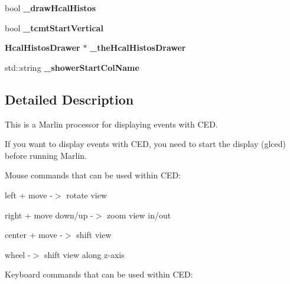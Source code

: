 \begin{DoxyCompactItemize}
\item 
bool {\bfseries \-\_\-draw\-Hcal\-Histos}\label{classCALICE_1_1EventDisplayProcessor_a6763de26bb6b411cbace86b1df1a6070}

\item 
bool {\bfseries \-\_\-tcmt\-Start\-Vertical}\label{classCALICE_1_1EventDisplayProcessor_a6c010062901aec5839d39d9b54e1719e}

\item 
{\bf Hcal\-Histos\-Drawer} $\ast$ {\bfseries \-\_\-the\-Hcal\-Histos\-Drawer}\label{classCALICE_1_1EventDisplayProcessor_a5b204dde67e52d9a226af122dd6e0573}

\item 
std\-::string {\bfseries \-\_\-shower\-Start\-Col\-Name}\label{classCALICE_1_1EventDisplayProcessor_a91c75bbd29a29d5cdf625a0d5e6b6fcb}

\end{DoxyCompactItemize}


\subsection{Detailed Description}
This is a Marlin processor for displaying events with C\-E\-D. 

If you want to display events with C\-E\-D, you need to start the display ({\ttfamily glced}) before running Marlin.

Mouse commands that can be used within C\-E\-D\-:


\begin{DoxyItemize}
\item {\ttfamily  left + move } -\/$>$ rotate view
\item {\ttfamily  right + move down/up } -\/$>$ zoom view in/out
\item {\ttfamily  center + move } -\/$>$ shift view
\item {\ttfamily  wheel } -\/$>$ shift view along z-\/axis
\end{DoxyItemize}

Keyboard commands that can be used within C\-E\-D\-:


